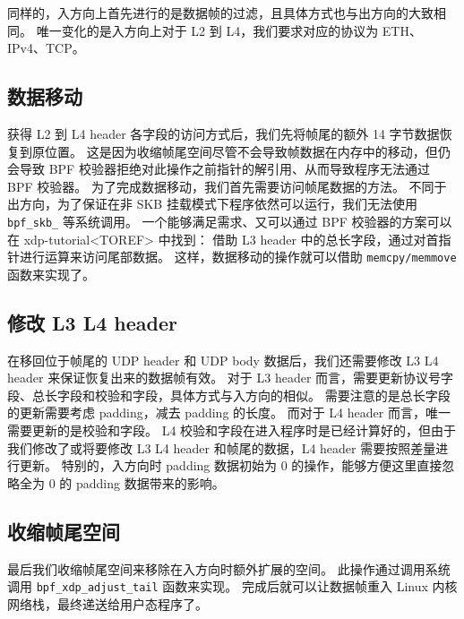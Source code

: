 同样的，入方向上首先进行的是数据帧的过滤，且具体方式也与出方向的大致相同。
唯一变化的是入方向上对于 L2 到 L4，我们要求对应的协议为 ETH、IPv4、TCP。

\subsection{数据移动}

获得 L2 到 L4 header 各字段的访问方式后，我们先将帧尾的额外 14 字节数据恢复到原位置。
这是因为收缩帧尾空间尽管不会导致帧数据在内存中的移动，但仍会导致 BPF 校验器拒绝对此操作之前指针的解引用、从而导致程序无法通过 BPF 校验器。
为了完成数据移动，我们首先需要访问帧尾数据的方法。
不同于出方向，为了保证在非 SKB 挂载模式下程序依然可以运行，我们无法使用 \texttt{bpf\_skb\_\*} 等系统调用。
一个能够满足需求、又可以通过 BPF 校验器的方案可以在 xdp-tutorial<TOREF> 中找到：
借助 L3 header 中的总长字段，通过对首指针进行运算来访问尾部数据。
这样，数据移动的操作就可以借助 \texttt{memcpy/memmove} 函数来实现了。

\subsection{修改 L3 L4 header}

在移回位于帧尾的 UDP header 和 UDP body 数据后，我们还需要修改 L3 L4 header 来保证恢复出来的数据帧有效。
对于 L3 header 而言，需要更新协议号字段、总长字段和校验和字段，具体方式与入方向的相似。
需要注意的是总长字段的更新需要考虑 padding，减去 padding 的长度。
而对于 L4 header 而言，唯一需要更新的是校验和字段。
L4 校验和字段在进入程序时是已经计算好的，但由于我们修改了或将要修改 L3 L4 header 和帧尾的数据，L4 header 需要按照差量进行更新。
特别的，入方向时 padding 数据初始为 0 的操作，能够方便这里直接忽略全为 0 的 padding 数据带来的影响。

\subsection{收缩帧尾空间}

最后我们收缩帧尾空间来移除在入方向时额外扩展的空间。
此操作通过调用系统调用 \texttt{bpf\_xdp\_adjust\_tail} 函数来实现。
完成后就可以让数据帧重入 Linux 内核网络栈，最终递送给用户态程序了。
